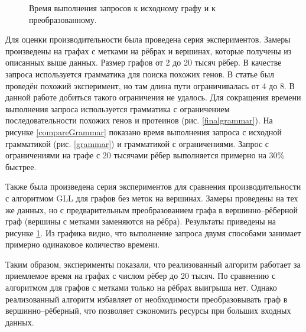 \documentclass[14pt]{matmex-diploma}
\begin{document}
\begin{figure}
\begin{center}
\end{center}
\caption{Время выполнения запросов к исходному графу и к преобразованному.}
\label{compareGraph}
\end{figure}

Для оценки производительности была проведена серия экспериментов. Замеры произведены на графах с метками на рёбрах и вершинах, которые получены из описанных выше данных. Размер графов от 2 до 20 тысяч рёбер. В качестве запроса используется грамматика для поиска похожих генов. В статье \cite{subgraph} был проведён похожий эксперимент, но там длина пути ограничивалась от 4 до 8. В данной работе добиться такого ограничения не удалось. Для сокращения времени выполнения запроса используется грамматика с ограничением последовательности похожих генов и протеинов (рис. \ref{finalgrammar}). На рисунке \ref{compareGrammar} показано время выполнения запроса с исходной грамматикой (рис. \ref{grammar}) и грамматикой с ограничениями. Запрос с ограничениями на графе с 20 тысячами рёбер выполняется примерно на 30\% быстрее.

Также была произведена серия экспериментов для сравнения производительности с алгоритмом GLL для графов без меток на вершинах. Замеры проведены на тех же данных, но с предварительным преобразованием графа в вершинно--рёберной граф (вершины с метками заменяются на рёбра). Результаты приведены на рисунке \ref{compareGraph}. Из графика видно, что выполнение запроса двумя способами занимает примерно одинаковое количество времени.

Таким образом, эксперименты показали, что реализованный алгоритм работает за приемлемое время на графах с числом рёбер до 20 тысяч. По сравнению с алгоритмом для графов с метками только на рёбрах выигрыша нет. Однако реализованный алгоритм избавляет от необходимости преобразовывать граф в вершинно--рёберный, что позволяет сэкономить ресурсы при больших входных данных.
\end{document}
